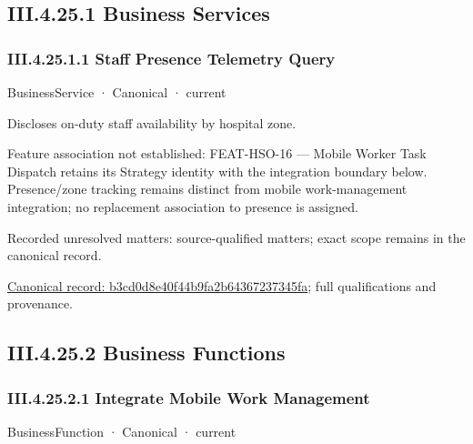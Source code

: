 \subsection*{III.4.25.1 Business Services}
\label{navigation:III.4.25.1}

\subsubsection*{III.4.25.1.1 Staff Presence Telemetry Query}
\label{navigation:III.4.25.1.1}

\label{element:b3cd0d8e40f44b9fa2b64367237345fa}
{\small BusinessService · Canonical · current}\par

Discloses on-duty staff availability by hospital zone.



Feature association not established: FEAT-HSO-16 — Mobile Worker Task Dispatch retains its Strategy identity with the integration boundary below. Presence/zone tracking remains distinct from mobile work-management integration; no replacement association to presence is assigned.


{\small Recorded unresolved matters: source-qualified matters; exact scope remains in the canonical record.}\par
{\footnotesize \href{../../../../continuum/business/business-service/b3cd0d8e40f44b9fa2b64367237345fa.md}{Canonical record: b3cd0d8e40f44b9fa2b64367237345fa}; full qualifications and provenance.}\par
\subsection*{III.4.25.2 Business Functions}
\label{navigation:III.4.25.2}

\subsubsection*{III.4.25.2.1 Integrate Mobile Work Management}
\label{navigation:III.4.25.2.1}

\label{element:81f97ad819da48f09f26029066550e08}
{\small BusinessFunction · Canonical · current}\par

